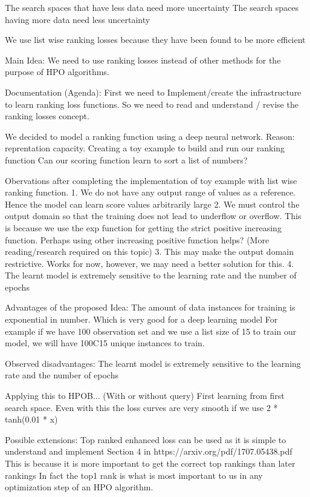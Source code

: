 \documentclass[11pt]{report}
\begin{document}
The search spaces that have less data need more uncertainty
The search spaces having more data need less uncertainty

We use list wise ranking losses because they have been found to be more efficient

Main Idea:
    We need to use ranking losses instead of other methods for the purpose of HPO algorithms.


Documentation (Agenda):
    First we need to Implement/create the infrastructure to learn ranking loss functions.
    So we need to read and understand / revise the ranking losses concept.

    We decided to model a ranking function using a deep neural network.
        Reason: reprentation capacity.
%
    Creating a toy example to build and run our ranking function
        Can our scoring function learn to sort a list of numbers? 

    Obervations after completing the implementation of toy example with list wise ranking function.
        1. We do not have any output range of values as a reference. Hence the model can learn score values arbitrarily large
        2. We must control the output domain so that the training does not lead to underflow or overflow.
            This is because we use the exp function for getting the strict positive increasing function.
            Perhaps using other increasing positive function helps? (More reading/research required on this topic)
        3. This may make the output domain restrictive. Works for now, however, we may need a better solution for this.
        4. The learnt model is extremely sensitive to the learning rate and the number of epochs

Advantages of the proposed Idea:
    The amount of data instances for training is exponential in number. Which is very good for a deep learning model
    For example if we have 100 observation set and we use a list size of 15 to train our model, we will have 100C15
    unique instances to train.


Observed disadvantages:
    The learnt model is extremely sensitive to the learning rate and the number of epochs


Applying this to HPOB... (With or without query)
    First learning from first search space.
    Even with this the loss curves are very smooth if we use 2 * tanh(0.01 * x)


Possible extensions:
    Top ranked enhanced loss can be used as it is simple to understand and implement
    Section 4 in https://arxiv.org/pdf/1707.05438.pdf
    This is because it is more important to get the correct top rankings than later rankings
    In fact the top1 rank is what is most important to us in any optimization step of an HPO algorithm.
    
\end{document}
